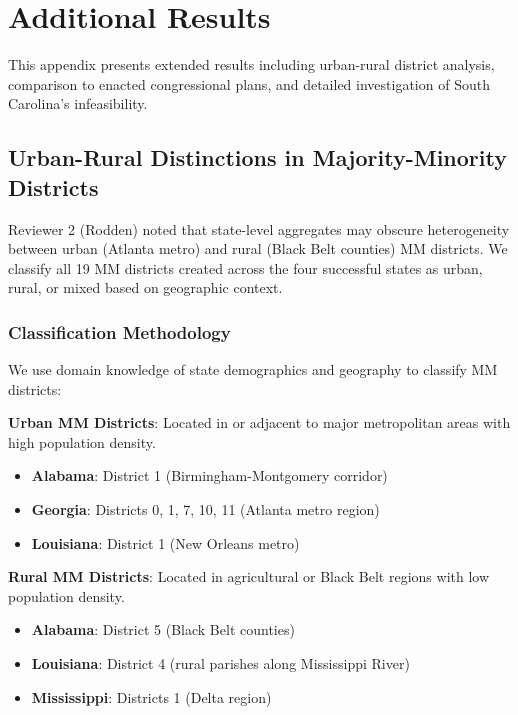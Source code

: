 
\section{Additional Results}
\label{appendix:results}

This appendix presents extended results including urban-rural district analysis, comparison to enacted congressional plans, and detailed investigation of South Carolina's infeasibility.

\subsection{Urban-Rural Distinctions in Majority-Minority Districts}

Reviewer 2 (Rodden) noted that state-level aggregates may obscure heterogeneity between urban (Atlanta metro) and rural (Black Belt counties) MM districts. We classify all 19 MM districts created across the four successful states as urban, rural, or mixed based on geographic context.

\subsubsection{Classification Methodology}

We use domain knowledge of state demographics and geography to classify MM districts:

\textbf{Urban MM Districts}: Located in or adjacent to major metropolitan areas with high population density.
\begin{itemize}
    \item \textbf{Alabama}: District 1 (Birmingham-Montgomery corridor)
    \item \textbf{Georgia}: Districts 0, 1, 7, 10, 11 (Atlanta metro region)
    \item \textbf{Louisiana}: District 1 (New Orleans metro)
\end{itemize}

\textbf{Rural MM Districts}: Located in agricultural or Black Belt regions with low population density.
\begin{itemize}
    \item \textbf{Alabama}: District 5 (Black Belt counties)
    \item \textbf{Louisiana}: District 4 (rural parishes along Mississippi River)
    \item \textbf{Mississippi}: Districts 1 (Delta region)
\end{itemize}


